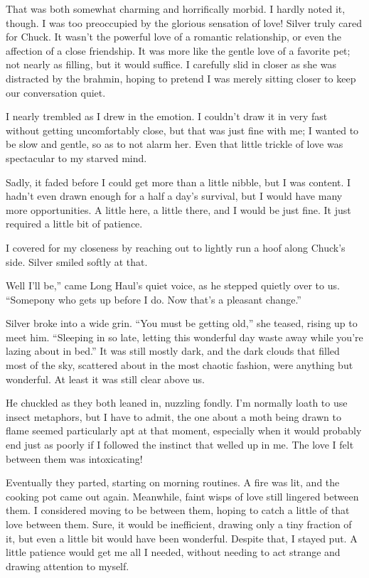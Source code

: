 That was both somewhat charming and horrifically morbid. I hardly noted it, though. I was too preoccupied by the glorious sensation of love! Silver truly cared for Chuck. It wasn’t the powerful love of a romantic relationship, or even the affection of a close friendship. It was more like the gentle love of a favorite pet; not nearly as filling, but it would suffice. I carefully slid in closer as she was distracted by the brahmin, hoping to pretend I was merely sitting closer to keep our conversation quiet.

I nearly trembled as I drew in the emotion. I couldn’t draw it in very fast without getting uncomfortably close, but that was just fine with me; I wanted to be slow and gentle, so as to not alarm her. Even that little trickle of love was spectacular to my starved mind.

Sadly, it faded before I could get more than a little nibble, but I was content. I hadn’t even drawn enough for a half a day’s survival, but I would have many more opportunities. A little here, a little there, and I would be just fine. It just required a little bit of patience.

I covered for my closeness by reaching out to lightly run a hoof along Chuck’s side. Silver smiled softly at that.

\leavevmode{}Well I’ll be,” came Long Haul’s quiet voice, as he stepped quietly over to us. “Somepony who gets up before I do. Now that’s a pleasant change.”

Silver broke into a wide grin. “You must be getting old,” she teased, rising up to meet him. “Sleeping in so late, letting this wonderful day waste away while you’re lazing about in bed.” It was still mostly dark, and the dark clouds that filled most of the sky, scattered about in the most chaotic fashion, were anything but wonderful. At least it was still clear above us.

He chuckled as they both leaned in, nuzzling fondly. I’m normally loath to use insect metaphors, but I have to admit, the one about a moth being drawn to flame seemed particularly apt at that moment, especially when it would probably end just as poorly if I followed the instinct that welled up in me. The love I felt between them was intoxicating!

Eventually they parted, starting on morning routines. A fire was lit, and the cooking pot came out again. Meanwhile, faint wisps of love still lingered between them. I considered moving to be between them, hoping to catch a little of that love between them. Sure, it would be inefficient, drawing only a tiny fraction of it, but even a little bit would have been wonderful. Despite that, I stayed put. A little patience would get me all I needed, without needing to act strange and drawing attention to myself.

